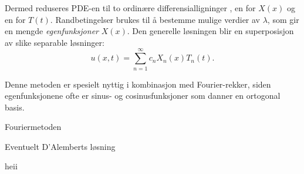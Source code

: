     Dermed reduseres PDE-en til to ordinære differensialligninger , en for $X(x)$ og en for $T(t)$. Randbetingelser brukes til å bestemme mulige verdier av $\lambda$, som gir en mengde \emph{egenfunksjoner} $X(x)$. Den generelle løsningen blir en superposisjon av slike separable løsninger:
    \[
    u(x,t) = \sum_{n=1}^\infty c_n X_n(x) T_n(t).
    \]

    Denne metoden er spesielt nyttig i kombinasjon med Fourier-rekker, siden egenfunksjonene ofte er sinus- og cosinusfunksjoner som danner en ortogonal basis.


    Fouriermetoden

    Eventuelt D’Alemberts løsning

    heii
